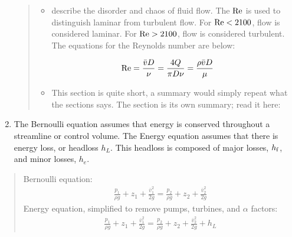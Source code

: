 \documentclass[letterpaper,10pt,english]{sphinxmanual}
\begin{document}
\begin{enumerate}
\begin{quote}
\begin{itemize}
\item {} 
 describe the disorder and chaos of fluid flow. The  \({\rm Re}\) is used to distinguish laminar from turbulent flow. For \({\rm Re} < 2100\), flow is considered laminar. For \({\rm Re} > 2100\), flow is considered turbulent. The equations for the Reynolds number are below:

\end{itemize}
\begin{equation}\label{equation:Fluids_Review/Fluids_Review_Design:Fluids_Review/Fluids_Review_Design:37}
\begin{split}{\rm Re} = \frac{\bar vD}{\nu} = \frac{4Q}{\pi D\nu} = \frac{\rho \bar vD}{\mu}\end{split}
\end{equation}\begin{itemize}
\item {} 
 This section is quite short, a summary would simply repeat what the sections says. The section is its own summary; read it here: {\hyperref[\detokenize{Fluids_Review/Fluids_Review_Design:id5}]{}}

\end{itemize}
\end{quote}

\item {} 
 The Bernoulli equation assumes that energy is conserved throughout a streamline or control volume. The Energy equation assumes that there is energy loss, or headloss \(h_L\). This headloss is composed of major losses, \(h_{\rm{f}}\), and minor losses, \(h_e\).

\end{enumerate}
\begin{quote}

Bernoulli equation:
\begin{equation}\label{equation:Fluids_Review/Fluids_Review_Design:Fluids_Review/Fluids_Review_Design:38}
\begin{split}\frac{p_1}{\rho g} + {z_1} + \frac{\bar v_1^2}{2g} = \frac{p_2}{\rho g} + {z_2} + \frac{\bar v_2^2}{2g}\end{split}
\end{equation}
Energy equation, simplified to remove pumps, turbines, and \(\alpha\) factors:
\begin{equation}\label{equation:Fluids_Review/Fluids_Review_Design:Fluids_Review/Fluids_Review_Design:39}
\begin{split}\frac{p_{1}}{\rho g} + z_{1} + \frac{\bar v_{1}^2}{2g} = \frac{p_{2}}{\rho g} + z_{2} + \frac{\bar v_{2}^2}{2g} + h_L\end{split}
\end{equation}\end{quote}
\end{document}
